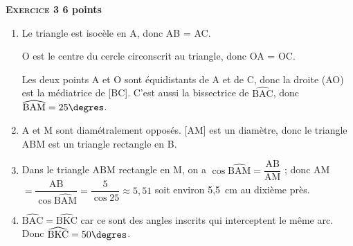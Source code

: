 \textbf{\textsc{Exercice 3} \hfill 6 points}

\medskip

% 
%

\begin{enumerate}
\item %
Le triangle est isocèle en A, donc AB = AC.

O est le centre du cercle circonscrit au triangle, donc OA = OC.

Les deux points A et O sont équidistants de A et de C, donc la droite (AO) est la médiatrice de [BC]. C’est aussi la bissectrice de $\widehat{\text{BAC}}$, donc $\widehat{\text{BAM}} = 25\degres$.
\item %
A et M sont diamétralement opposés. [AM] est un diamètre, donc le triangle ABM est un triangle rectangle en B.
\item %
Dans le triangle ABM rectangle en M, on a $\cos   \widehat{\text{BAM}} = \dfrac{\text{AB}}{\text{AM}}$ ; donc AM $ = \dfrac{\text{AB}}{ \cos  \widehat{\text{BAM}}} = \dfrac{5}{ \cos 25} \approx 5,51$ soit environ 5,5~cm au dixième près.
\item %
$\widehat{\text{BAC}} = \widehat{\text{BKC}}$ car ce sont des angles inscrits qui interceptent le même arc. Donc $\widehat{\text{BKC}} = 50\degres$.

\end{enumerate}

\bigskip


